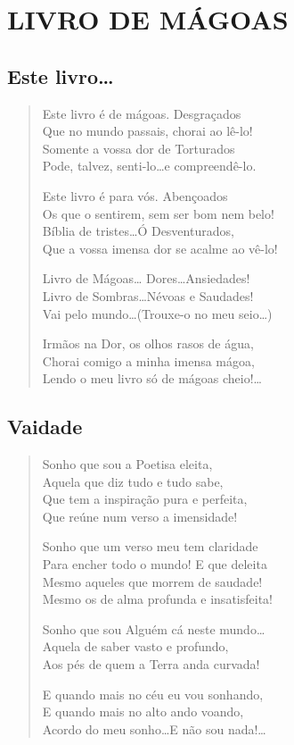 \part{LIVRO DE MÁGOAS} 

\chapter{Este livro\ldots  }

\begin{verse}
Este livro é de mágoas. Desgraçados\\
Que no mundo passais, chorai ao lê-lo!\\
Somente a vossa dor de Torturados\\
Pode, talvez, senti-lo\ldots  e compreendê-lo.

Este livro é para vós. Abençoados\\
Os que o sentirem, sem ser bom nem belo!\\
Bíblia de tristes\ldots  Ó Desventurados,\\
Que a vossa imensa dor se acalme ao vê-lo!

Livro de Mágoas\ldots 
Dores\ldots  Ansiedades!\\
Livro de Sombras\ldots  Névoas e Saudades!\\
Vai pelo mundo\ldots (Trouxe-o no meu seio\ldots )

Irmãos na Dor, os olhos rasos de água,\\
Chorai comigo a minha imensa mágoa,\\
Lendo o meu livro só de mágoas cheio!\ldots  
\end{verse}

\chapter{Vaidade}

\begin{verse}
Sonho que sou a Poetisa eleita,\\
Aquela que diz tudo e tudo sabe,\\
Que tem a inspiração pura e perfeita,\\
Que reúne num verso a imensidade!

Sonho que um verso meu tem claridade\\
Para encher todo o mundo! E que deleita\\
Mesmo aqueles que morrem de saudade!\\
Mesmo os de alma profunda e insatisfeita!

Sonho que sou Alguém cá neste mundo\ldots  \\
Aquela de saber vasto e profundo,\\
Aos pés de quem a Terra anda curvada!

E quando mais no céu eu vou sonhando,\\
E quando mais no alto ando voando,\\
Acordo do meu sonho\ldots  E não sou nada!\ldots  
\end{verse}

